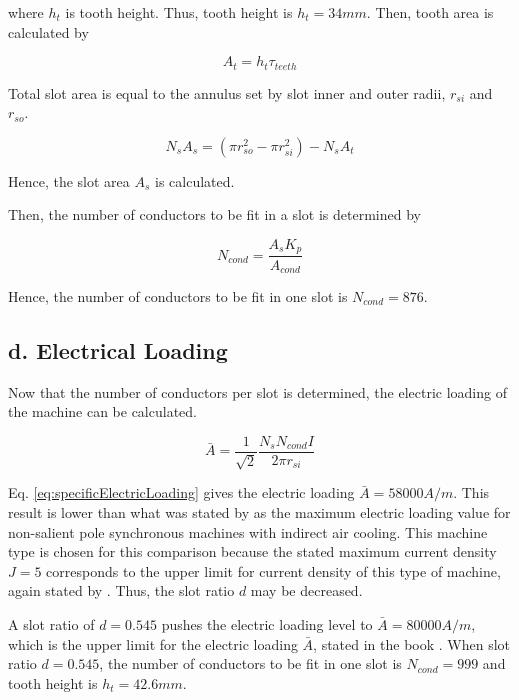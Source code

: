 \documentclass[a4paper, 11pt, titlepage]{article}
\begin{document}
where $h_t$ is tooth height. Thus, tooth height is $h_t=34mm$. Then, tooth area is calculated by

\begin{equation}
	A_t = h_t \tau_{teeth}
\end{equation}

Total slot area is equal to the annulus set by slot inner and outer radii, $r_{si}$ and $r_{so}$.

\begin{equation}
	N_sA_s = (\pi r_{so}^2 - \pi r_{si}^2)-N_sA_t
\end{equation}

Hence, the slot area $A_s$ is calculated.

Then, the number of conductors to be fit in a slot is determined by

\begin{equation}
	N_{cond} = \frac{A_sK_p}{A_{cond}}
	\label{eq:numberOfConductorsPerSlot}
\end{equation}

Hence, the number of conductors to be fit in one slot is $N_{cond}=876$. 


\subsection{d. Electrical Loading}


Now that the number of conductors per slot is determined, the electric loading of the machine can be calculated. 

\begin{equation}
	\bar{A} = \frac{1}{\sqrt{2}}\frac{N_sN_{cond}I}{2\pi r_{si}}
	\label{eq:specificElectricLoading}
\end{equation}

Eq. \ref{eq:specificElectricLoading} gives the electric loading $\bar{A}=58000A/m$. This result is lower than what was stated by \cite{pyrhonen} as the maximum electric loading value for non-salient pole synchronous machines with indirect air cooling. This machine type is chosen for this comparison because the stated maximum current density $J=5$ corresponds to the upper limit for current density of this type of machine, again stated by \cite{pyrhonen}. Thus, the slot ratio $d$ may be decreased. 

A slot ratio of $d=0.545$ pushes the electric loading level to $\bar{A}=80000A/m$, which is the upper limit for the electric loading $\bar{A}$, stated in the book \cite{pyrhonen}. When slot ratio $d=0.545$, the number of conductors to be fit in one slot is $N_{cond}=999$ and tooth height is $h_t=42.6mm$.
\end{document}
